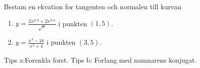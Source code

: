 



Bestam en ekvation for tangenten och normalen till kurvan

\begin{enumerate}
\item $ y = \frac{2x^{2/3}+2x^{3/4}}{\sqrt{x}} $ i punkten $ (1,5) $.
\item $ y = \frac{x^4-16}{x^2+4} $ i punkten $ (3,5) $.
\end{enumerate}
Tips a:Forenkla forst. Tips b: Forlang med namnarens konjugat. 